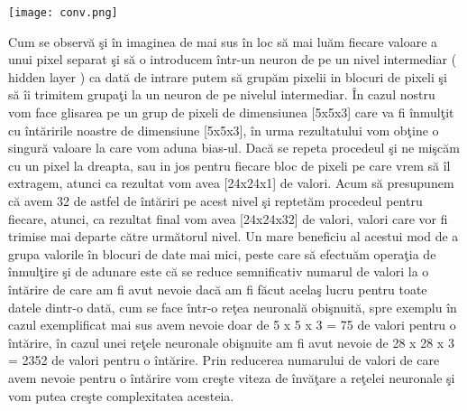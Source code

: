 \begin{center}
\texttt{[image: conv.png]}
\end{center}

Cum se observ\u{a} \c{s}i \^{i}n imaginea de mai sus \^{i}n loc s\u{a} mai lu\u{a}m fiecare valoare a unui pixel separat \c{s}i s\u{a} o introducem \^{i}ntr-un neuron de pe un nivel intermediar ( hidden layer ) ca dat\u{a} de intrare putem s\u{a} grup\u{a}m pixelii in blocuri de pixeli \c{s}i s\u{a} \^{i}i trimitem grupa\c{t}i la un neuron de pe nivelul intermediar. \^{I}n cazul nostru vom face glisarea pe un grup de pixeli de dimensiunea [5x5x3] care va fi \^{i}nmul\c{t}it cu \^{i}nt\u{a}ririle noastre de dimensiune [5x5x3], \^{i}n urma rezultatului vom ob\c{t}ine o singur\u{a} valoare la care vom aduna bias-ul. Dac\u{a} se repeta procedeul  \c{s}i ne mi\c{s}c\u{a}m cu un pixel la dreapta, sau in jos pentru fiecare bloc de pixeli pe care vrem s\u{a} \^{i}l extragem, atunci ca rezultat vom avea [24x24x1] de valori. Acum s\u{a} presupunem c\u{a} avem 32 de astfel de \^{i}nt\u{a}riri pe acest nivel \c{s}i reptet\u{a}m procedeul pentru fiecare, atunci, ca rezultat final vom avea [24x24x32] de valori, valori care vor fi trimise mai departe c\u{a}tre urm\u{a}torul nivel. Un mare beneficiu al acestui mod de a grupa valorile \^{i}n blocuri de date mai mici, peste care s\u{a} efectu\u{a}m opera\c{t}ia de \^{i}nmul\c{t}ire \c{s}i de adunare este c\u{a} se reduce semnificativ numarul de valori la o  \^{i}nt\u{a}rire de care am fi avut nevoie dac\u{a} am fi f\u{a}cut acela\c{s} lucru pentru toate datele dintr-o dat\u{a}, cum se face \^{i}ntr-o re\c{t}ea neuronal\u{a} obi\c{s}nuit\u{a}, spre exemplu \^{i}n cazul exemplificat mai sus avem nevoie doar de 5 x 5 x 3 = 75 de valori pentru o \^{i}nt\u{a}rire, \^{i}n cazul unei re\c{t}ele neuronale obi\c{s}nuite am fi avut nevoie de 28 x 28 x 3 = 2352 de valori pentru o \^{i}nt\u{a}rire. Prin reducerea numarului de valori de care avem nevoie pentru o \^{i}nt\u{a}rire vom cre\c{s}te viteza de \^{i}nv\u{a}\c{t}are a re\c{t}elei neuronale \c{s}i vom putea cre\c{s}te complexitatea acesteia.

\par

